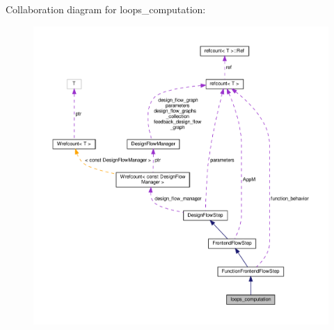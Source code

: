 Collaboration diagram for loops\+\_\+computation\+:
\nopagebreak
\begin{figure}[H]
\begin{center}
\leavevmode
\includegraphics[width=350pt]{d9/d4a/classloops__computation__coll__graph}
\end{center}
\end{figure}
